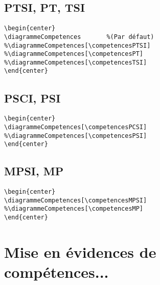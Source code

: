 \documentclass[a4paper,12pt]{article}
\begin{document}
		
	
		\subsection{PTSI, PT, TSI}
		
		
			\begin{verbatim}
\begin{center}
\diagrammeCompetences		%(Par défaut)
%\diagrammeCompetences[\competencesPTSI]
%\diagrammeCompetences[\competencesPT]
%\diagrammeCompetences[\competencesTSI]
\end{center}
			\end{verbatim}

			\begin{center}
				\diagrammeCompetences
			\end{center}
		

		\subsection{PSCI, PSI}
		
			\begin{verbatim}
\begin{center}
\diagrammeCompetences[\competencesPCSI]
%\diagrammeCompetences[\competencesPSI]
\end{center}
			\end{verbatim}
			
			\begin{center}
				\diagrammeCompetences[\competencesPSI]
			\end{center}

		\subsection{MPSI, MP}
		
			\begin{verbatim}
\begin{center}
\diagrammeCompetences[\competencesMPSI]
%\diagrammeCompetences[\competencesMP]
\end{center}
			\end{verbatim}
			
			\begin{center}
				\diagrammeCompetences[\competencesMP]
			\end{center}

		
		
		
	\section{Mise en évidences de compétences...}
	
\end{document}
